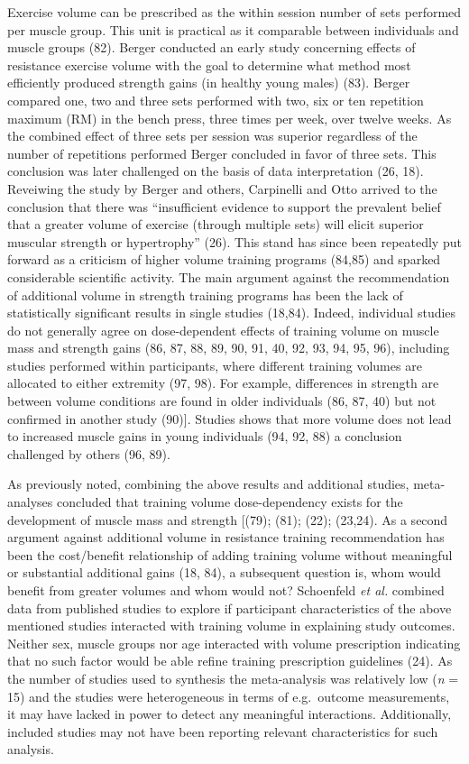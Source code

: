 \documentclass[twoside,10pt]{gihclass} %
\begin{document}
Exercise volume can be prescribed as the within session number of sets performed per muscle group. This unit is practical as it comparable between individuals and muscle groups (82).
Berger conducted an early study concerning effects of resistance exercise volume with the goal to determine what method most efficiently produced strength gains (in healthy young males) (83). Berger compared one, two and three sets performed with two, six or ten repetition maximum (RM) in the bench press, three times per week, over twelve weeks. As the combined effect of three sets per session was superior regardless of the number of repetitions performed Berger concluded in favor of three sets. This conclusion was later challenged on the basis of data interpretation
(26, 18).
Reveiwing the study by Berger and others, Carpinelli and Otto arrived to the conclusion that there was ``insufficient evidence to support the prevalent belief that a greater volume of exercise (through multiple sets) will elicit superior muscular strength or hypertrophy'' (26). This stand has since been repeatedly put forward as a criticism of higher volume training programs
(84,85) and sparked considerable scientific activity. The main argument against the recommendation of additional volume in strength training programs has been the lack of statistically significant results in single studies (18,84).
Indeed, individual studies do not generally agree on dose-dependent effects of training volume on muscle mass and strength gains
(86, 87, 88, 89, 90, 91, 40, 92, 93, 94, 95, 96),
including studies performed within participants, where different training volumes are allocated to either extremity
(97, 98).
For example, differences in strength are between volume conditions are found in older individuals
(86, 87, 40)
but not confirmed in another study
(90){]}.
Studies shows that more volume does not lead to increased muscle gains in young individuals
(94, 92, 88)
a conclusion challenged by others
(96, 89).

As previously noted, combining the above results and additional studies, meta-analyses concluded that training volume dose-dependency exists for the development of muscle mass and strength
{[}(79);
(81);
(22);
(23,24).
As a second argument against additional volume in resistance training recommendation has been the cost/benefit relationship of adding training volume without meaningful or substantial additional gains
(18, 84),
a subsequent question is, whom would benefit from greater volumes and whom would not?
Schoenfeld \emph{et al.} combined data from published studies to explore if participant characteristics of the above mentioned studies interacted with training volume in explaining study outcomes. Neither sex, muscle groups nor age interacted with volume prescription indicating that no such factor would be able refine training prescription guidelines
(24).
As the number of studies used to synthesis the meta-analysis was relatively low (\emph{n} = 15) and the studies were heterogeneous in terms of e.g.~outcome measurements, it may have lacked in power to detect any meaningful interactions. Additionally, included studies may not have been reporting relevant characteristics for such analysis.
\end{document}
